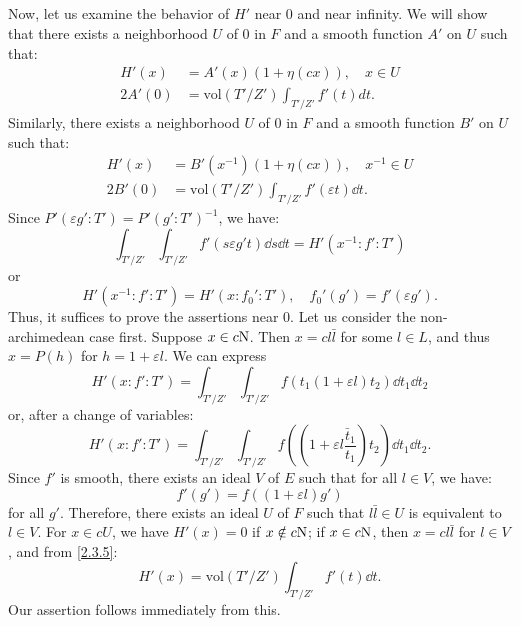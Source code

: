 \subsection{}
Now, let us examine the behavior of $H'$ near 0 and near infinity. We will show that there exists a neighborhood $U$ of $0$ in $F$ and a smooth function $A'$ on $U$ such that:
\begin{align}
    H'(x) &= A'(x) (1 + \eta(cx)), \quad x \in U \\
    2A'(0) &= \mathrm{vol}(T'/Z') \int_{T'/Z'} f'(t) dt.
\end{align}
Similarly, there exists a neighborhood $U$ of 0 in $F$ and a smooth function $B'$ on $U$ such that:
\begin{align}
    H'(x) &= B'(x^{-1}) (1 + \eta(cx)), \quad x^{-1} \in U \\
    2B'(0) &= \mathrm{vol}(T'/Z') \int_{T'/Z'} f'(\varepsilon t) \dd t.
\end{align}
Since $P'(\varepsilon g': T') = {P'(g':T')}^{-1}$, we have:
\[
\int_{T'/Z'} \int_{T'/Z'} f'(s\varepsilon g't) \dd s \dd t = H'(x^{-1}:f':T')
\]
or
\[
H'(x^{-1}:f': T') = H'(x:f_0':T'), \quad f_0'(g') = f'(\varepsilon g').
\]
Thus, it suffices to prove the assertions near 0.
Let us consider the non-archimedean case first.
Suppose $x \in c\mathrm{N}$.
Then $x = cl\bar{l}$ for some $l \in L$, and thus $x = P(h)$ for $h = 1 + \varepsilon l$.
We can express
\[
H'(x:f':T')=\int_{T'/Z'} \int_{T'/Z'} f(t_1 (1 + \varepsilon l) t_2) \dd t_1 \dd t_2
\]
or, after a change of variables:
\begin{equation}
    \label{2.3.5}
    H'(x:f':T') = \int_{T'/Z'} \int_{T'/Z'} f\left(\left(1 + \varepsilon l \frac{\bar{t}_{1}}{t_ {1}} \right)t_{2} \right) \dd t_1 \dd t_2.
\end{equation}
Since $f'$ is smooth, there exists an ideal $V$ of $E$ such that for all $l \in V$, we have:
\[
f'(g') = f((1 + \varepsilon l) g')
\]
for all $g'$.
Therefore, there exists an ideal $U$ of $F$ such that $l\bar{l} \in U$ is equivalent to $l \in V$. For $x \in cU$, we have $H'(x) = 0$ if $x \notin c\mathrm{N}$; if $x \in c\mathrm{N}$, then $x = cl\bar{l}$ for $l \in V$, and from \eqref{2.3.5}:
\[
H'(x) = \mathrm{vol}(T'/Z') \int_{T'/Z'} f'(t) \dd t.
\]
Our assertion follows immediately from this.

